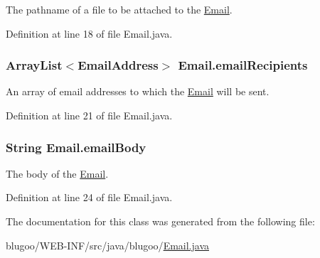 The pathname of a file to be attached to the \hyperlink{classEmail}{Email}. 



Definition at line 18 of file Email.java.\hypertarget{classEmail_827bd37ef7e05880918e0892f18a7450}{
\subsubsection{\setlength{\rightskip}{0pt plus 5cm}ArrayList$<${\bf EmailAddress}$>$ {\bf Email.emailRecipients}}}
\label{classEmail_827bd37ef7e05880918e0892f18a7450}


An array of email addresses to which the \hyperlink{classEmail}{Email} will be sent. 



Definition at line 21 of file Email.java.\hypertarget{classEmail_39cbe20535392cc1f1277b49785a4cbe}{
\subsubsection{\setlength{\rightskip}{0pt plus 5cm}String {\bf Email.emailBody}}}
\label{classEmail_39cbe20535392cc1f1277b49785a4cbe}


The body of the \hyperlink{classEmail}{Email}. 



Definition at line 24 of file Email.java.

The documentation for this class was generated from the following file:\begin{CompactItemize}
\item 
blugoo/WEB-INF/src/java/blugoo/\hyperlink{Email_8java}{Email.java}\end{CompactItemize}
